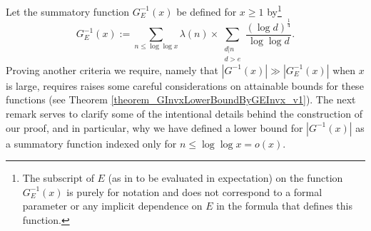 \documentclass[11pt,reqno,a4letter]{article}
\numberwithin{figure}{section}
\numberwithin{table}{section}
\theoremstyle{plain}
\numberwithin{theorem}{section}
\theoremstyle{definition}
\begin{document}
Let the summatory function $G_E^{-1}(x)$ be defined for $x \geq 1$ by\footnote{ 
     The subscript of $E$ (as in to be evaluated in expectation) 
     on the function $G_E^{-1}(x)$ is purely for notation and does not correspond to 
     a formal parameter or any implicit dependence on $E$ in the formula 
     that defines this function. 
}
\begin{equation} 
\label{eqn_GEInvxSummatoryFuncDef_v1} 
G_E^{-1}(x) := \sum_{n \leq \log\log x} \lambda(n) \times 
     \sum_{\substack{d|n \\ d > e}} \frac{(\log d)^{\frac{1}{4}}}{\log\log d}. 
\end{equation} 
Proving another criteria we require, namely that $|G^{-1}(x)| \gg |G_E^{-1}(x)|$ when $x$ is large, 
requires raises some careful considerations on attainable bounds for these functions 
(see Theorem \ref{theorem_GInvxLowerBoundByGEInvx_v1}). 
The next remark serves to clarify some of the intentional details behind the construction of 
our proof, and in particular, why we have defined a lower bound for $|G^{-1}(x)|$ as 
a summatory function indexed only for $n \leq \log\log x = o(x)$. 
\end{document}
